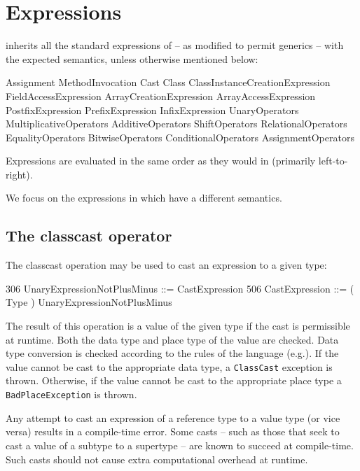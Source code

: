 \section{Expressions}\label{XtenExpressions}

{}\Xten{} inherits all the standard expressions of \Java{}
\cite[\S~15]{jls2} -- as modified to permit generics \cite{gjspec} --
with the expected semantics, unless otherwise mentioned below:

\begin{x10}
Assignment MethodInvocation 
Cast Class
ClassInstanceCreationExpression FieldAccessExpression   
ArrayCreationExpression ArrayAccessExpression
PostfixExpression PrefixExpression 
InfixExpression UnaryOperators
MultiplicativeOperators AdditiveOperators 
ShiftOperators RelationalOperators  
EqualityOperators BitwiseOperators
ConditionalOperators AssignmentOperators
\end{x10}

Expressions are evaluated in the same order as they would in \java{}
(primarily
left-to-right).\label{FieldAccess}\label{ClassCreation}\label{MethodInvocation}

We focus on the expressions in \Xten{} which have a different
semantics.

\subsection{The classcast operator}\label{ClassCast}
The classcast operation may be used to cast an expression to a given type:
\begin{x10}
306 UnaryExpressionNotPlusMinus ::= 
      CastExpression
506 CastExpression ::= 
      ( Type ) UnaryExpressionNotPlusMinus
\end{x10}

The result of this operation is a value of the given type if the cast
is permissible at runtime. Both the data type and place type of the
value are checked. Data type conversion is checked according to the
rules of the \java{} language (e.g.{}\cite[\S 5.5]{jls2}). If the
value cannot be cast to the appropriate data type, a {\tt ClassCast}
exception is thrown. Otherwise, if the value cannot be cast to the
appropriate place type a {\tt BadPlaceException} is thrown. 

Any attempt to cast an expression of a reference type to a value type
(or vice versa) results in a compile-time error. Some casts -- such as
those that seek to cast a value of a subtype to a supertype -- are
known to succeed at compile-time. Such casts should not cause extra
computational overhead at runtime.

